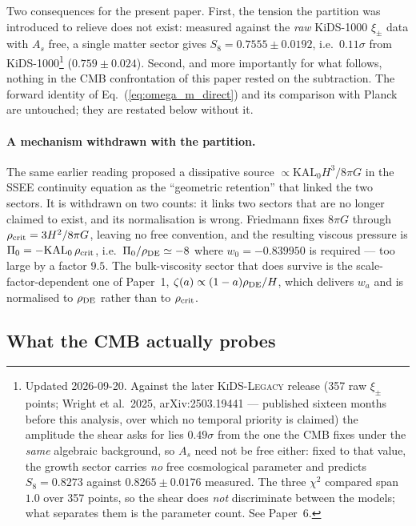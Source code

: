 \documentclass[12pt,a4paper]{article}
\begin{document}
Two consequences for the present paper. First, the tension the partition was
introduced to relieve does not exist: measured against the \emph{raw}
KiDS-1000 $\xi_\pm$ data with $A_s$ free, a single matter sector gives
$S_8 = 0.7555 \pm 0.0192$, i.e.\ $0.11\sigma$ from KiDS-1000\footnote{Updated 2026-09-20. Against the later \textsc{KiDS-Legacy} release (357 raw $\xi_\pm$ points; Wright et al.\ 2025, arXiv:2503.19441 --- published sixteen months before this analysis, over which no temporal priority is claimed) the amplitude the shear asks for lies $0.49\sigma$ from the one the CMB fixes under the \emph{same} algebraic background, so $A_s$ need not be free either: fixed to that value, the growth sector carries \emph{no} free cosmological parameter and predicts $S_8=0.8273$ against $0.8265\pm0.0176$ measured. The three $\chi^2$ compared span $1.0$ over 357 points, so the shear does \emph{not} discriminate between the models; what separates them is the parameter count. See Paper~6.}
($0.759\pm0.024$). Second, and more importantly for what follows, nothing in
the CMB confrontation of this paper rested on the subtraction. The forward
identity of Eq.~(\ref{eq:omega_m_direct}) and its comparison with Planck are
untouched; they are restated below without it.

\paragraph{A mechanism withdrawn with the partition.}
The same earlier reading proposed a dissipative source
$\propto \mathrm{KAL}_0 H^3/8\pi G$ in the SSEE continuity equation as the
``geometric retention'' that linked the two sectors. It is withdrawn on two
counts: it links two sectors that are no longer claimed to exist, and its
normalisation is wrong. Friedmann fixes $8\pi G$ through
$\rho_{\rm crit}=3H^2/8\pi G$, leaving no free convention, and the resulting
viscous pressure is $\Pi_0 = -\mathrm{KAL}_0\,\rho_{\rm crit}$, i.e.\
$\Pi_0/\rho_{\rm DE} \simeq -8$ where $w_0=-0.839950$ is required --- too large by a
factor $9.5$. The bulk-viscosity sector that does survive is the
scale-factor-dependent one of Paper~1, $\zeta(a)\propto(1-a)\rho_{\rm DE}/H$,
which delivers $w_a$ and is normalised to $\rho_{\rm DE}$ rather than to
$\rho_{\rm crit}$.

\subsection{What the CMB actually probes}
\end{document}

